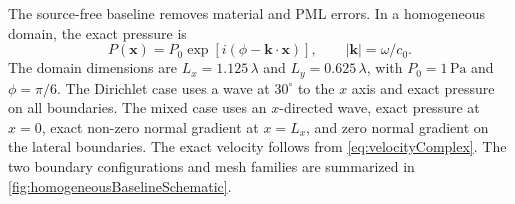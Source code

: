 \documentclass[final,12pt,nopreprintline,longtitle]{elsarticle}
\newcommand{\x}{\mathbf{x}}
\begin{document}
The source-free baseline removes material and PML errors.  In a homogeneous
domain, the exact pressure is
\begin{equation}
    P(\x)=P_0\exp\!\left[i(\phi-\mathbf{k}\cdot\x)\right],
    \qquad |\mathbf{k}|=\omega/c_0.
    \label{eq:homogeneousPlaneWave}
\end{equation}
The domain dimensions are $L_x=1.125\, \lambda$ and
$L_y=0.625\, \lambda$, with $P_0=1\,\mathrm{Pa}$ and $\phi=\pi/6$.
The Dirichlet case uses a wave at $30^\circ$ to the $x$ axis and exact pressure
on all boundaries.  The mixed case uses an $x$-directed wave, exact pressure at
$x=0$, exact non-zero normal gradient at $x=L_x$, and zero normal gradient on
the lateral boundaries.  The exact velocity follows from
\cref{eq:velocityComplex}.  The two boundary configurations and mesh families
are summarized in \cref{fig:homogeneousBaselineSchematic}.
\end{document}
